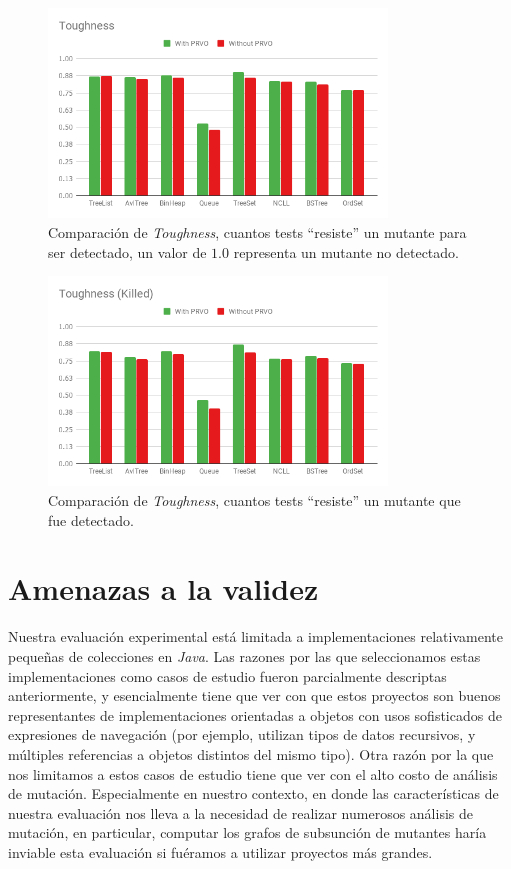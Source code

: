 \begin{figure}
	\begin{center}
		\includegraphics[width=9cm]{figures/Toughness.png}
	\end{center}
	\caption{Comparaci\'on de \emph{Toughness}, cuantos tests ``resiste'' un mutante para ser detectado, un valor de $1.0$ representa un mutante no detectado.}
	\label{toughness-results}
\end{figure}

\begin{figure}
	\begin{center}
		\includegraphics[width=9cm]{figures/ToughnessKilled.png}
	\end{center}
	\caption{Comparaci\'on de \emph{Toughness}, cuantos tests ``resiste'' un mutante que fue detectado.}
	\label{toughnessKilled-results}
\end{figure}


\section{Amenazas a la validez}

Nuestra evaluaci\'on experimental est\'a limitada a implementaciones relativamente peque\~nas de colecciones en \emph{Java}. Las razones por las que seleccionamos estas implementaciones como casos de estudio fueron parcialmente descriptas anteriormente, y esencialmente tiene que ver con que estos proyectos son buenos representantes de implementaciones orientadas a objetos con usos sofisticados de expresiones de navegaci\'on (por ejemplo, utilizan tipos de datos recursivos, y m\'ultiples referencias a objetos distintos del mismo tipo). Otra raz\'on por la que nos limitamos a estos casos de estudio tiene que ver con el alto costo de an\'alisis de mutaci\'on. Especialmente en nuestro contexto, en donde las caracter\'isticas de nuestra evaluaci\'on nos lleva a la necesidad de realizar numerosos an\'alisis de mutaci\'on, en particular, computar los grafos de subsunci\'on de mutantes har\'ia inviable esta evaluaci\'on si fu\'eramos a utilizar proyectos m\'as grandes.

